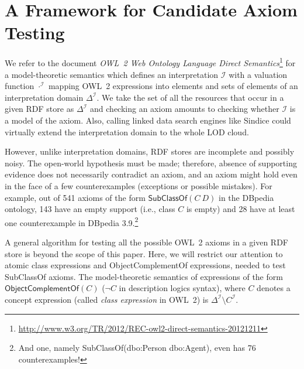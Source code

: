 \documentclass{llncs}
\begin{document}
\section{A Framework for Candidate Axiom Testing}
\label{OWL2SPARQL}

We refer to the document
\textit{OWL~2 Web Ontology Language Direct Semantics}\footnote{\url{http://www.w3.org/TR/2012/REC-owl2-direct-semantics-20121211}} for a model-theoretic semantics 
which defines an interpretation $\mathcal{I}$ with a valuation function
$\cdot^\mathcal{I}$ mapping OWL~2 expressions into
elements and sets of elements of an interpretation domain $\Delta^\mathcal{I}$.
We take the set of all the resources that occur in a given RDF store 
as $\Delta^\mathcal{I}$ and checking an axiom 
amounts to checking whether $\mathcal{I}$ is a model of the axiom. Also, calling linked data search engines
like Sindice could virtually extend the interpretation domain to the whole LOD cloud.

However, unlike interpretation domains, RDF stores are incomplete and
possibly noisy. The open-world hypothesis must be made; therefore, absence of
supporting evidence does not necessarily contradict an axiom, and an axiom might
hold even in the face of a few counterexamples (exceptions or possible mistakes).
For example, out of 541 axioms of the form $\mathsf{SubClassOf}(C\ D)$ in the DBpedia
ontology, 143 have an empty support (i.e., class $C$ is empty)
and 28 have at least one counterexample in DBpedia 3.9.\footnote{And one, namely
\textsf{SubClassOf}(\textsf{dbo:Person} \textsf{dbo:Agent}), even has 76 counterexamples!}


A general algorithm for testing all the possible OWL~2 axioms in a given RDF store is beyond the scope of this paper. 
Here, we will restrict our attention to atomic class expressions and \textsf{ObjectComplementOf}
expressions, needed to test \textsf{SubClassOf} axioms.
The model-theoretic semantics of expressions of the form $\mathsf{ObjectComplementOf}(C)$
($\neg C$ in description logics syntax), where $C$ denotes a concept expression
(called \emph{class expression} in OWL~2) is $\Delta^\mathcal{I} \setminus C^\mathcal{I}$.
\end{document}
